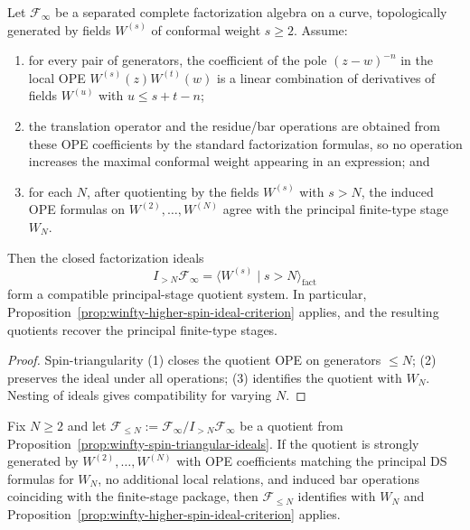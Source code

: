\begin{proposition}
\label{prop:winfty-spin-triangular-ideals}
Let $\mathcal{F}_\infty$ be a separated complete factorization algebra
on a curve, topologically generated by fields $W^{(s)}$ of conformal
weight $s \ge 2$. Assume:
\begin{enumerate}
\item for every pair of generators, the coefficient of the pole
 $(z-w)^{-n}$ in the local OPE
 $W^{(s)}(z)W^{(t)}(w)$ is a linear combination of derivatives of
 fields $W^{(u)}$ with $u \le s+t-n$;
\item the translation operator and the residue/bar operations are
 obtained from these OPE coefficients by the standard factorization
 formulas, so no operation increases the maximal conformal weight
 appearing in an expression; and
\item for each $N$, after quotienting by the fields $W^{(s)}$ with
 $s>N$, the induced OPE formulas on
 $W^{(2)},\dots,W^{(N)}$ agree with the principal finite-type stage
 $W_N$.
\end{enumerate}
Then the closed factorization ideals
\[
I_{>N}\mathcal{F}_\infty
= \langle W^{(s)} \mid s>N\rangle_{\mathrm{fact}}
\]
form a compatible principal-stage quotient system. In particular,
Proposition~\ref{prop:winfty-higher-spin-ideal-criterion} applies, and
the resulting quotients recover the principal finite-type stages.
\end{proposition}

\begin{proof}
Spin-triangularity (1) closes the quotient OPE on generators $\le N$; (2) preserves the ideal under all operations; (3) identifies the quotient with $W_N$. Nesting of ideals gives compatibility for varying $N$.
\end{proof}

\begin{proposition}
\label{prop:winfty-ds-coefficient-criterion}
Fix $N \ge 2$ and let
$\mathcal{F}_{\le N}:=\mathcal{F}_\infty/I_{>N}\mathcal{F}_\infty$
be a quotient from
Proposition~\ref{prop:winfty-spin-triangular-ideals}.
If the quotient is strongly generated by $W^{(2)},\dots,W^{(N)}$ with
OPE coefficients matching the principal DS formulas for $W_N$, no
additional local relations, and induced bar operations coinciding with
the finite-stage package, then $\mathcal{F}_{\le N}$ identifies with
$W_N$ and
Proposition~\ref{prop:winfty-higher-spin-ideal-criterion} applies.
\end{proposition}

